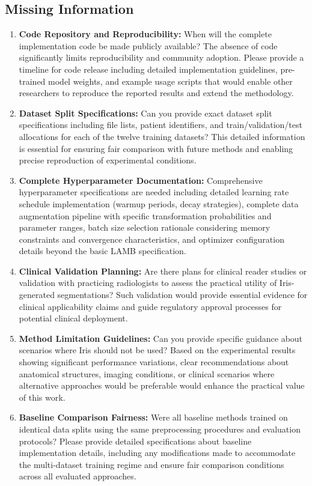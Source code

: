 \subsection{Missing Information}
\begin{enumerate}
    \item \textbf{Code Repository and Reproducibility:} When will the complete implementation code be made publicly available? The absence of code significantly limits reproducibility and community adoption. Please provide a timeline for code release including detailed implementation guidelines, pre-trained model weights, and example usage scripts that would enable other researchers to reproduce the reported results and extend the methodology.
    
    \item \textbf{Dataset Split Specifications:} Can you provide exact dataset split specifications including file lists, patient identifiers, and train/validation/test allocations for each of the twelve training datasets? This detailed information is essential for ensuring fair comparison with future methods and enabling precise reproduction of experimental conditions.
    
    \item \textbf{Complete Hyperparameter Documentation:} Comprehensive hyperparameter specifications are needed including detailed learning rate schedule implementation (warmup periods, decay strategies), complete data augmentation pipeline with specific transformation probabilities and parameter ranges, batch size selection rationale considering memory constraints and convergence characteristics, and optimizer configuration details beyond the basic LAMB specification.
    
    \item \textbf{Clinical Validation Planning:} Are there plans for clinical reader studies or validation with practicing radiologists to assess the practical utility of Iris-generated segmentations? Such validation would provide essential evidence for clinical applicability claims and guide regulatory approval processes for potential clinical deployment.
    
    \item \textbf{Method Limitation Guidelines:} Can you provide specific guidance about scenarios where Iris should not be used? Based on the experimental results showing significant performance variations, clear recommendations about anatomical structures, imaging conditions, or clinical scenarios where alternative approaches would be preferable would enhance the practical value of this work.
    
    \item \textbf{Baseline Comparison Fairness:} Were all baseline methods trained on identical data splits using the same preprocessing procedures and evaluation protocols? Please provide detailed specifications about baseline implementation details, including any modifications made to accommodate the multi-dataset training regime and ensure fair comparison conditions across all evaluated approaches.
\end{enumerate}